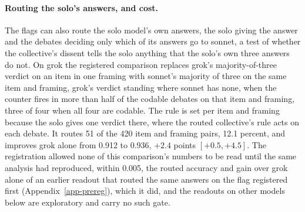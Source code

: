 \paragraph{Routing the solo's answers, and cost.}
The flags can also route the solo model's own answers, the solo giving the
answer and the debates deciding only which of its answers go to sonnet, a
test of whether the collective's dissent tells the solo anything that the
solo's own three answers do not. On grok the registered comparison replaces
grok's majority-of-three verdict on an item in one framing with sonnet's
majority of three on the same item and framing, grok's verdict standing
where sonnet has none, when the counter fires in more than half of the
codable debates on that item and framing, three of four when all four are
codable. The rule is set per item and framing because the solo gives one
verdict there, where the routed collective's rule acts on each debate. It
routes 51 of the 420 item and framing pairs, 12.1 percent, and improves grok
alone from 0.912 to 0.936, $+2.4$ points $[+0.5, +4.5]$.
The registration allowed none of this comparison's numbers to be read until
the same analysis had reproduced, within 0.005, the routed accuracy and gain
over grok alone of an earlier readout that routed the same answers on the
flag registered first (Appendix~\ref{app-prereg}), which it did, and the
readouts on other models below are exploratory and carry no such gate.
